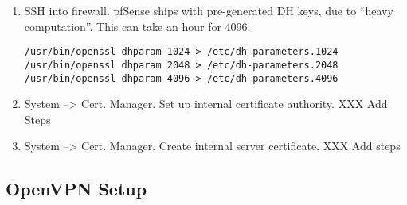 \begin{enumerate}
 \item SSH into firewall. pfSense ships with pre-generated DH keys, due to ``heavy computation''. This can take an hour for 4096.
\begin{verbatim}
/usr/bin/openssl dhparam 1024 > /etc/dh-parameters.1024
/usr/bin/openssl dhparam 2048 > /etc/dh-parameters.2048
/usr/bin/openssl dhparam 4096 > /etc/dh-parameters.4096
\end{verbatim}
 \item System --> Cert. Manager. Set up internal certificate authority. XXX Add Steps
 \item System --> Cert. Manager. Create internal server certificate. XXX Add steps
\end{enumerate}

\subsection{OpenVPN Setup}
